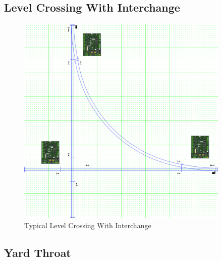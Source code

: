 \subsection{Level Crossing With Interchange}
\begin{figure}[hbpt]\begin{centering}%
\includegraphics[width=4in]{ESP32S3-LevelCrossingWInterchange.png}
\caption{Typical Level Crossing With Interchange}
\label{fig:LevelCrossingWInterchange}
\end{centering}\end{figure}

\subsection{Yard Throat}
